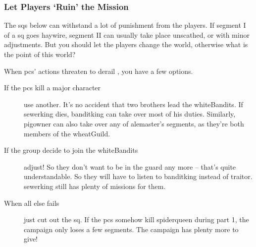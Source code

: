 \begin{multicols}{2}
\subsubsection{Let Players `Ruin' the Mission}

The \glspl{sq} below can withstand a lot of punishment from the players.
If \gls{segment} I of a \gls{sq} goes haywire, \gls{segment} II can usually take place unscathed, or with minor adjustments.
But you should let the players change the world, otherwise what is the point of this world?

When \glspl{pc}' actions threaten to derail , you have a few options.

\begin{description}
  \item[If the \glspl{pc} kill a major character]
  use another.
  It's no accident that two brothers lead the \gls{whiteBandits}.
  If \gls{sewerking} dies, \gls{banditking} can take over most of his duties.
  Similarly, \gls{pigowner} can also take over any of \gls{alemaster}'s \glspl{segment}, as they're both members of the \gls{wheatGuild}.
  \item[If the group decide to join the \gls{whiteBandits}]
  adjust!
  So they don't want to be in the \gls{guard} any more -- that's quite understandable.
  So they will have to listen to \gls{banditking} instead of \gls{traitor}.
  \Gls{sewerking} still has plenty of missions for them.
  \item[When all else fails]
  just cut out the \gls{sq}.
  If the \glspl{pc} somehow kill \gls{spiderqueen} during part 1, the campaign only loses a few \glspl{segment}.
  The campaign has plenty more to give!
\end{description}

\renewcommand\csComments{
  \mapCircle{16}{76}{1.7}{Dyson_Logos/bandit_camp}
  \mapCircle{35}{88}{2}{Dyson_Logos/forgotten_city}
  \mapCircle{27}{09}{2}{Dyson_Logos/qualme_temple}
  \mapCircle[4]{56}{52}{2.5}{Dyson_Logos/town}
  \mapCircle{83}{09}{1.7}{Dyson_Logos/shadow_gate}
  \mapCircle{86}{45}{1.7}{Dyson_Logos/lakeside}
  \draw[very thick,white] (11,0.6) -- (12,0.6) node[anchor=north]{\outline{10 Miles}} -- (13,0.6) ;
}



\end{multicols}

